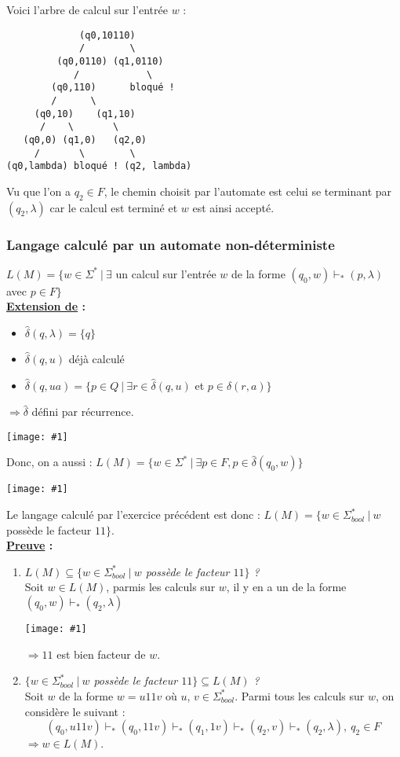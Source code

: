 \documentclass{article}
\newcommand{\titre}[1]{\textcolor{title}{#1}}
\newcommand{\tsssect}[1]{\titre{\subsubsection{#1}}}
\newcommand{\term}[1]{\textit{\textcolor{maintitle}{#1}}}
\newcommand{\imgR}[2]{\begin{center}\texttt{[image: \#1]}\end{center}}
\begin{document}
\begin{sffamily}
Voici l'arbre de calcul sur l'entrée $w$ : \\

\begin{center}
	\begin{verbatim}
             (q0,10110)
             /        \
         (q0,0110) (q1,0110)
            /            \
        (q0,110)      bloqué !
        /      \
     (q0,10)    (q1,10)
      /    \       \
   (q0,0) (q1,0)   (q2,0)
     /       \        \
(q0,lambda) bloqué ! (q2, lambda)
	\end{verbatim}
\end{center}

Vu que l'on a $q_2 \in F$, le chemin choisit par l'automate est celui se terminant par $(q_2,\lambda)$ car le calcul 
est \indent terminé et $w$ est ainsi accepté.

\tsssect{Langage calculé par un automate non-déterministe}

$L(M)= \{w \in \Sigma^*\ |\ \exists$ un calcul sur l'entrée $w$ de la forme $(q_0,w) \vdash_* (p,\lambda)$ avec $p\in F 
\}$ \\

\textbf{\underline{Extension de} :}

\begin{multicols}{2}
\begin{itemize}
\item $\hat{\delta}(q,\lambda) = \{q\}$
\item $\hat{\delta}(q,u)$ déjà calculé
\item $\hat{\delta}(q,ua) = \{p\in Q\ |\ \exists r\in \hat{\delta}(q,u)$ et $p\in \delta(r,a)\}$
\end{itemize}
$\Rightarrow \hat{\delta}$ défini par récurrence.
\imgR{img16.png}{100}
\end{multicols}

Donc, on a aussi : $L(M) = \{w \in \Sigma^*\ |\ \exists p\in F, p \in \hat{\delta}(q_0,w)\}$\\
\imgR{img17.png}{100}

Le langage calculé par l'exercice précédent est donc : $L(M) = \{w \in \Sigma^*_{bool}\ |\ w$ possède le facteur 
$11\}$. \\
\newpage
\textbf{\underline{Preuve} :} 
\begin{enumerate}
\item \term{$L(M) \subseteq \{w \in \Sigma^*_{bool}\ |\ w$ possède le facteur $11 \}$ ?} \\
Soit $w \in L(M)$, parmis les calculs sur $w$, il y en a un de la forme $(q_0,w) \vdash_* (q_2,\lambda)$
\imgR{img18.png}{200}
$\Rightarrow 11$ est bien facteur de $w$.
\item \term{$\{w \in \Sigma^*_{bool}\ |\ w$ possède le facteur $11 \} \subseteq L(M)$ ?} \\
Soit $w$ de la forme $w = u11v$ où $u$, $v \in \Sigma^*_{bool}$. Parmi tous les calculs sur $w$, on considère le 
suivant : $$ (q_0, u11v) \vdash_* (q_0,11v) \vdash_* (q_1,1v) \vdash_* (q_2,v) \vdash_* (q_2,\lambda),\ q_2\in F$$
$\Rightarrow w \in L(M)$.
\end{enumerate}


\end{sffamily}
\end{document}
